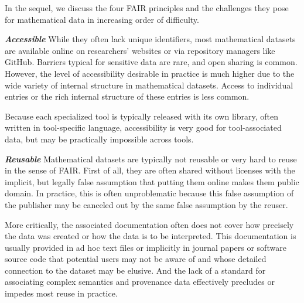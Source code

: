 In the sequel, we discuss the four FAIR principles and the challenges they pose for mathematical data in increasing order of difficulty.
\medskip

\noindent\textbf{\emph{Accessible}}
While they often lack unique identifiers, most mathematical datasets are available online on researchers' websites or via repository managers like GitHub.
Barriers typical for sensitive data are rare, and open sharing is common.
However, the level of accessibility desirable in practice is much higher due to the wide variety of internal structure in mathematical datasets.
Access to individual entries or the rich internal structure of these entries is less common.

Because each specialized tool is typically released with its own library, often written in tool-specific language, accessibility is very good for tool-associated data, but may be practically impossible across tools.


\medskip

\textbf{\emph{Reusable}}
Mathematical datasets are typically not reusable or very hard to reuse in the sense of FAIR.
First of all, they are often shared without licenses with the implicit, but legally false assumption that putting them online makes them public domain.
In practice, this is often unproblematic because this false assumption of the publisher may be canceled out by the same false assumption by the reuser.

More critically, the associated documentation often does not cover how precisely the data was created or how the data is to be interpreted.
This documentation is usually provided in ad hoc text files or implicitly in journal papers or software source code that potential users may not be aware of and whose detailed connection to the dataset may be elusive.
And the lack of a standard for associating complex semantics and provenance data effectively precludes or impedes most reuse in practice.

